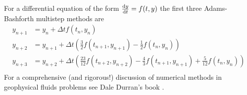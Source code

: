 \documentclass[a4paper, sfsidenotes, twoside]{tufte-handout}
\begin{document}
  For a differential equation of the form $ \frac{\operatorname{d}\!{} y}{\operatorname{d}\!{t}} = f(t, y) $ the
  first three Adams-Bashforth multistep methods are
  \begin{align*}
    y_{n+1} &= y_n + \Delta t f(t_n, y_n)  \\
    y_{n+2} &= y_{n+1} + \Delta t \left( \frac{3}{2}f(t_{n+1}, y_{n+1}) - \frac{1}{2}f(t_n, y_n) \right) \\
    y_{n+3} &= y_{n+2} + \Delta t \left( \frac{23}{12} f(t_{n+2}, y_{n+2}) - \frac{4}{3} f(t_{n+1}, y_{n+1}) + \frac{5}{12}f(t_n, y_n)\right) \\
  \end{align*}
  For a comprehensive (and rigorous!) discussion of numerical methods in
  geophysical fluids problems see Dale Durran's book \cite{Durran:2010hy}.




\end{document}
